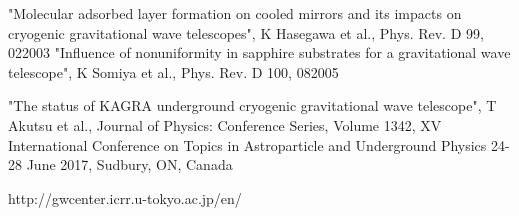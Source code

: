 \begin{thebibliography}{99}
 "Molecular adsorbed layer formation on cooled mirrors and its impacts on cryogenic gravitational wave telescopes", K Hasegawa et al., Phys. Rev. D 99, 022003
 "Influence of nonuniformity in sapphire substrates for a gravitational wave telescope", K Somiya et al., Phys. Rev. D 100, 082005

 "The status of KAGRA underground cryogenic gravitational wave telescope", T Akutsu et al., Journal of Physics: Conference Series, Volume 1342, XV International Conference on Topics in Astroparticle and Underground Physics 24-28 June 2017, Sudbury, ON, Canada



%
%
%



%
%
%




 http://gwcenter.icrr.u-tokyo.ac.jp/en/

\end{thebibliography}
\fi




